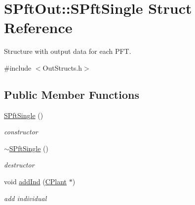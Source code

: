 \hypertarget{struct_s_pft_out_1_1_s_pft_single}{}\section{S\+Pft\+Out\+::S\+Pft\+Single Struct Reference}
\label{struct_s_pft_out_1_1_s_pft_single}


Structure with output data for each P\+FT.  




{\ttfamily \#include $<$Out\+Structs.\+h$>$}

\subsection*{Public Member Functions}
\begin{DoxyCompactItemize}
\item 
\mbox{\hyperlink{struct_s_pft_out_1_1_s_pft_single_ada9eb58ae1c564fe1e1aa6c058bffa79}{S\+Pft\+Single}} ()
\begin{DoxyCompactList}\small\item\em constructor \end{DoxyCompactList}\item 
\mbox{\label{struct_s_pft_out_1_1_s_pft_single_a5ac22baf3913baf86950d84789d2eb0f}} 
\mbox{\hyperlink{struct_s_pft_out_1_1_s_pft_single_a5ac22baf3913baf86950d84789d2eb0f}{$\sim$\+S\+Pft\+Single}} ()
\begin{DoxyCompactList}\small\item\em destructor \end{DoxyCompactList}\item 
void \mbox{\hyperlink{struct_s_pft_out_1_1_s_pft_single_ad6ef86bf03a08bd7dee1583f80d57e2c}{add\+Ind}} (\mbox{\hyperlink{class_c_plant}{C\+Plant}} $\ast$)
\begin{DoxyCompactList}\small\item\em add individual \end{DoxyCompactList}\end{DoxyCompactItemize}
